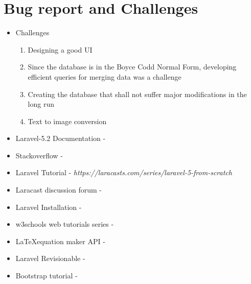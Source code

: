 \documentclass[a4paper,12pt,oneside]{book}
\begin{document}
\section{Bug report and Challenges}
    \begin{itemize}
      \item Challenges
         \begin{enumerate}
            \item Designing a good UI
            \item Since the database is in the Boyce Codd Normal Form, developing efficient queries for merging data was a challenge
           \item Creating the database that shall not suffer major modifications in the long run
           \item Text to image conversion
         \end{enumerate}
    \end{itemize}

\begin{thebibliography}{li}
    \begin{itemize}
        \item Laravel-5.2 Documentation - 
        \item Stackoverflow - 
        \item Laravel Tutorial - \textit{https://laracasts.com/series/laravel-5-from-scratch} 
        \item Laracast discussion forum - 
        \item Laravel Installation - 
        \item w3schools web tutorials series - 
        \item \LaTeX equation maker API - 
        \item Laravel Revisionable - 
        \item Bootstrap tutorial - 
    \end{itemize}
\end{thebibliography}
\end{document}
